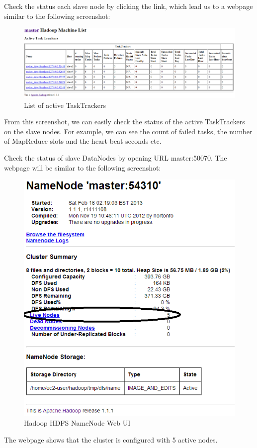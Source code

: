 Check the status each slave node by clicking the link, which lead us to a webpage similar to the following screenshot:

\begin{figure}[h]
  \centering
  \includegraphics[width=.8\textwidth]{figs/5163os_03_03.png}
  \caption{List of active TaskTrackers}\label{fig:active.trackers}
\end{figure} 


From this screenshot, we can easily check the status of the active TaskTrackers on the slave nodes. For example, we can see the count of failed tasks, the number of MapReduce slots and the heart beat seconds etc.

Check the status of slave DataNodes by opening URL master:50070. The webpage will be similar to the following screenshot: \\
\begin{figure}[h]
  \centering
  \includegraphics[width=.6\textwidth]{figs/5163os_03_04.png}
  \caption{Hadoop HDFS NameNode Web UI}\label{fig:namenode.webui}
\end{figure} 

The webpage shows that the cluster is configured with 5 active nodes.

